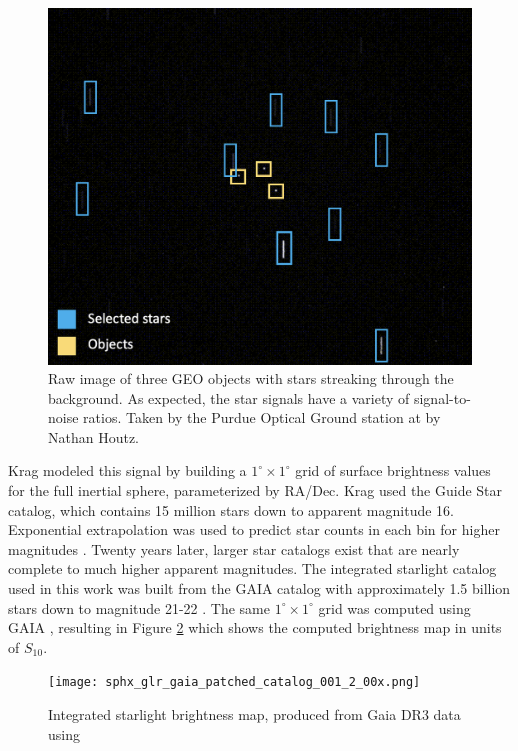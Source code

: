 \begin{figure}[ht]
  \centering
  \includegraphics[width=\figmed]{static_images/static_pogs_annotated.png}
  \caption{Raw image of three GEO objects with stars streaking through the background. As expected, the star signals have a variety of signal-to-noise ratios. Taken by the Purdue Optical Ground station at \pogslla by Nathan Houtz.}
  \label{fig:pogs_observation_example}
\end{figure}

Krag \cite{krag2003} modeled this signal by building a $1^\circ \times 1^\circ$ grid of surface
brightness values for the full inertial sphere, parameterized by RA/Dec. Krag used the
Guide Star catalog, which contains 15 million stars down to apparent magnitude 16. Exponential extrapolation
was used to predict star counts in each bin for higher magnitudes \cite{krag2003}. Twenty years later, larger star catalogs exist that are nearly complete to much higher apparent magnitudes. The integrated
starlight catalog used in this work was built from the GAIA catalog with approximately 1.5 billion
stars down to magnitude 21-22 \cite{gaia_dr3}. The same $1^\circ \times 1^\circ$ grid was computed
using GAIA \cite{astroquery_gaia}, resulting in Figure
\ref{fig:gaiapatched} which shows the computed brightness map in units of $S_{10}$. 

\begin{figure}[ht]
  \centering
  \texttt{[image: sphx\_glr\_gaia\_patched\_catalog\_001\_2\_00x.png]}
  \caption{Integrated starlight brightness map, produced from Gaia DR3 data \cite{gaia_dr3} using \cite{astroquery_gaia}}
  \label{fig:gaiapatched}
\end{figure}

